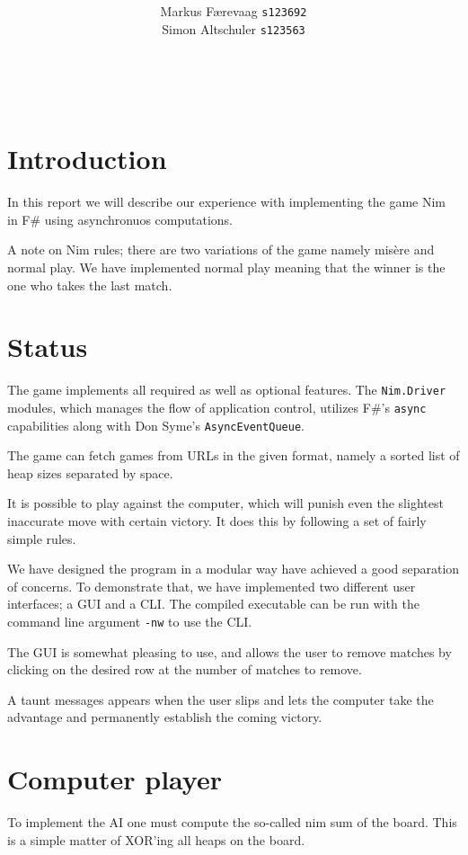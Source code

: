 \documentclass{article}
\title{\TITLE\\ {\large \COURSE}}
\date{\DATE}
\author{
  Markus Færevaag {\tt s123692}\\
  Simon Altschuler {\tt s123563}
}
\begin{document}
\maketitle
\vspace{10cm}
 \\
\clearpage

\section{Introduction}
In this report we will describe our experience with implementing the game Nim in F\# using asynchronuos computations.

A note on Nim rules; there are two variations of the game namely mis\`ere and normal play. We have implemented normal play meaning that the winner is the one who takes the last match.

\section{Status}
The game implements all required as well as optional features. The \texttt{Nim.Driver} modules, which manages the flow of application control, utilizes F\#'s \texttt{async} capabilities along with Don Syme's \texttt{AsyncEventQueue}.

The game can fetch games from URLs in the given format, namely a sorted list of heap sizes separated by space.

It is possible to play against the computer, which will punish even the slightest inaccurate move with certain victory. It does this by following a set of fairly simple rules.

We have designed the program in a modular way have achieved a good separation of concerns. To demonstrate that, we have implemented two different user interfaces; a GUI and a CLI. The compiled executable can be run with the command line argument \texttt{-nw} to use the CLI.

The GUI is somewhat pleasing to use, and allows the user to remove matches by clicking on the desired row at the number of matches to remove.

A taunt messages appears when the user slips and lets the computer take the advantage and permanently establish the coming victory.

\section{Computer player}
To implement the AI one must compute the so-called nim sum of the board. This is a simple matter of XOR'ing all heaps on the board.
\end{document}
